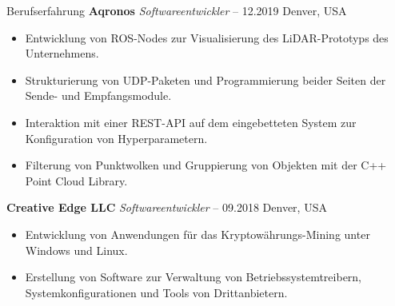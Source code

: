 \begin{rubric}{Berufserfahrung}
%
%
\entry*[] \textbf{Aqronos} \hfill \textit{Softwareentwickler}  -- 12.2019 \hfill Denver, USA \newline  
\vspace{\CVItemizeHeaderSpacing} \begin{itemize} 
	\setlength{\itemsep}{\CVItemizeSpacing}  
	\item Entwicklung von ROS-Nodes zur Visualisierung des LiDAR-Prototyps des Unternehmens.  
	\item Strukturierung von UDP-Paketen und Programmierung beider Seiten der Sende- und Empfangsmodule.  
	\item Interaktion mit einer REST-API auf dem eingebetteten System zur Konfiguration von Hyperparametern.  
	\item Filterung von Punktwolken und Gruppierung von Objekten mit der C++ Point Cloud Library.  
\end{itemize}



%
%
\entry*[] \textbf{Creative Edge LLC} \hfill \textit{Softwareentwickler}  -- 09.2018 \hfill Denver, USA \newline  
\vspace{\CVItemizeHeaderSpacing} \begin{itemize}  
	\setlength{\itemsep}{\CVItemizeSpacing}  
	\item Entwicklung von Anwendungen für das Kryptowährungs-Mining unter Windows und Linux.  
	\item Erstellung von Software zur Verwaltung von Betriebssystemtreibern, Systemkonfigurationen und Tools von Drittanbietern.  
\end{itemize}

\end{rubric}
